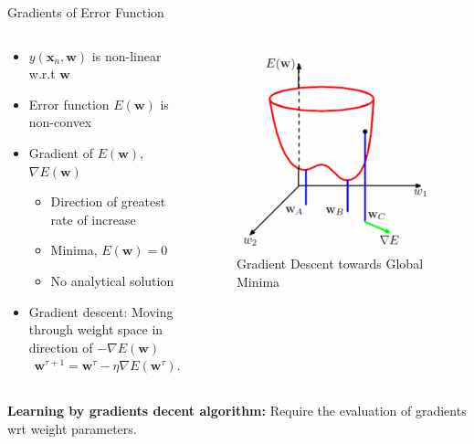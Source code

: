 \documentclass[10pt, hyperref={colorlinks = true,linkcolor = blue}]{beamer}
\begin{document}
{{{\begin{frame}{Gradients of Error Function}
\begin{columns}
        \begin{column}{0.6\textwidth}
\begin{itemize}
    \item $y(\bm x_n, \bm w)$ is non-linear w.r.t $\bm w$
    \item Error function $E(\bm w)$ is non-convex
    \item Gradient of $E(\bm w)$, $\nabla E(\bm w)$
    \begin{itemize}
        \item Direction of greatest rate of increase
        \item Minima, $E(\bm w) = 0$
        \item No analytical solution
    \end{itemize}
    \item Gradient descent: Moving through weight space in direction of $-\nabla E(\bm w)$
    \begin{align*}
        \bm w^{\tau +1} = \bm w^{\tau} - \eta \nabla E(\bm w^{\tau}).
    \end{align*}
\end{itemize}
\end{column}
 \begin{column}{0.4\textwidth}
\begin{figure}
    \includegraphics[width=\linewidth]{figures/GlobalMinima}
    \caption{Gradient Descent towards Global Minima}
\end{figure}
\end{column}
\end{columns}
\textbf{Learning by gradients decent algorithm:} Require the evaluation of gradients wrt weight parameters.
\end{frame}


}}}
\end{document}
